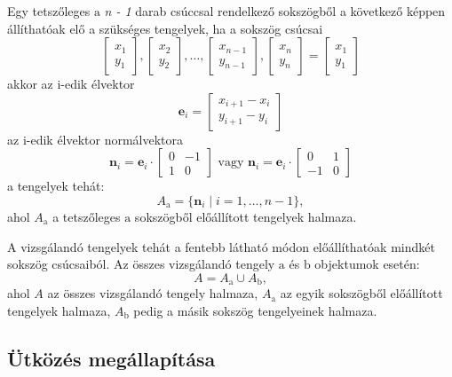 \documentclass[12pt]{report}
\begin{document}
Egy tetszőleges $\text{a}$ \textit{n - 1} darab csúccsal rendelkező sokszögből a következő képpen állíthatóak elő a szükséges tengelyek, ha a sokszög csúcsai 
\[
    \begin{bmatrix}
        x_1 \\
        y_1
    \end{bmatrix},
    \begin{bmatrix}
        x_2 \\
        y_2
    \end{bmatrix},
    \dots,
    \begin{bmatrix}
        x_{n - 1} \\
        y_{n - 1}
    \end{bmatrix},
    \begin{bmatrix}
        x_n \\
        y_n
    \end{bmatrix}=
    \begin{bmatrix}
        x_1 \\
        y_1
    \end{bmatrix}
\]    
akkor az i-edik élvektor
\[
    \mathbf{e}_i =
    \begin{bmatrix}
        x_{i + 1} - x_{i} \\
        y_{i + 1} - y_{i}
    \end{bmatrix}
\]
az i-edik élvektor normálvektora
\[
    \mathbf{n}_i = \mathbf{e}_i \cdot
    \begin{bmatrix}
        0 & -1 \\
        1 & 0
    \end{bmatrix}\text{ vagy }
    \mathbf{n}_i = \mathbf{e}_i \cdot
    \begin{bmatrix}
        0 & 1 \\
        -1 & 0
    \end{bmatrix}
\]
a tengelyek tehát:
\[
    A_{\text{a}} = \{\mathbf{n}_i \mid i = 1, \dots, n - 1\},
\]
ahol $A_{\text{a}}$ a tetszőleges $\text{a}$ sokszögből előállított tengelyek halmaza.

A vizsgálandó tengelyek tehát a fentebb látható módon előállíthatóak mindkét sokszög csúcsaiból. Az összes vizsgálandó tengely $\text{a}$ és $\text{b}$ objektumok esetén:
\[
    A = A_{\text{a}} \cup A_{\text{b}},
\]
ahol $A$ az összes vizsgálandó tengely halmaza, $A_{\text{a}}$ az egyik sokszögből előállított tengelyek halmaza, $A_{\text{b}}$ pedig a másik sokszög tengelyeinek halmaza.

\subsection{Ütközés megállapítása}
\end{document}
